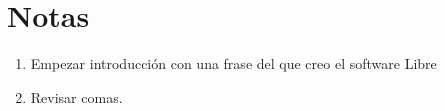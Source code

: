 \documentclass[a4paper, 12pt]{book}
\begin{document}
\chapter*{Notas}
\begin{enumerate}
    \item Empezar introducción con una frase del que creo el software Libre
    \item Revisar comas.
\end{enumerate}
\end{document}
